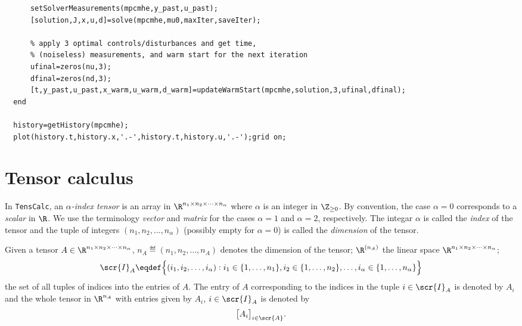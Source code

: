\documentclass[11pt]{article}
\newcommand{\TC}{\texttt{TensCalc}}
\theoremstyle{remark}
\begin{document}
\begin{lstlisting}
      setSolverMeasurements(mpcmhe,y_past,u_past);
      [solution,J,x,u,d]=solve(mpcmhe,mu0,maxIter,saveIter);
    
      % apply 3 optimal controls/disturbances and get time,
      % (noiseless) measurements, and warm start for the next iteration
      ufinal=zeros(nu,3);
      dfinal=zeros(nd,3);
      [t,y_past,u_past,x_warm,u_warm,d_warm]=updateWarmStart(mpcmhe,solution,3,ufinal,dfinal); 
  end

  history=getHistory(mpcmhe);
  plot(history.t,history.x,'.-',history.t,history.u,'.-');grid on;

\end{lstlisting}




\newpage

\appendix

\section{Tensor calculus}
\label{se:tensor-calculus}

In \TC{}, an \emph{$\alpha$-index tensor} is an array in
$\R^{n_1\times n_2\times\cdots\times n_\alpha}$ where $\alpha$ is an integer in
$\Z_{\ge 0}$. By convention, the case $\alpha=0$ corresponds to a
\emph{scalar} in $\R$. We use the terminology \emph{vector} and
\emph{matrix} for the cases $\alpha=1$ and $\alpha=2$, respectively. The integar
$\alpha$ is called the \emph{index} of the tensor and the tuple of integers
$(n_1,n_2,\dots,n_\alpha)$ (possibly empty for $\alpha=0$) is called the
\emph{dimension} of the tensor.

\medskip

Given a tensor $A\in\R^{n_1\times n_2\times\cdots\times n_\alpha}$,
$n_A\eqdef(n_1,n_2,\dots,n_A)$ denotes the dimension of the tensor;
$\R^{(n_A)}$ the linear space $\R^{n_1\times n_2\times\cdots\times n_\alpha}$;
\begin{align*}
  \scr{I}_A\eqdef \Big\{ (i_1,i_2,\dots,i_\alpha):  i_1\in\{1,\dots,n_1\},
  i_2\in\{1,\dots,n_2\}, \dots, i_\alpha\in\{1,\dots,n_\alpha\} \Big\}
\end{align*}
the set of all tuples of indices into the entries of $A$. The entry of
$A$ corresponding to the indices in the tuple $i\in\scr{I}_A$ is denoted
by $A_i$ and the whole tensor in $\R^{n_A}$ with entries given by
$A_i$, $i\in\scr{I}_A$ is denoted by
\begin{align*}
  \big[A_i\big]_{i\in\scr{A}}.
\end{align*}
\end{document}
